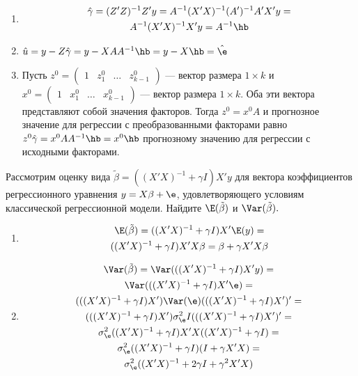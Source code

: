 \documentclass[pdftex,11pt,openany]{book}\usepackage[]{graphicx}\usepackage[]{color}
\begin{document}
\begin{solution}
\begin{enumerate}
\item 
\begin{multline}
\hat{\gamma} = (Z'Z)^{-1}Z'y = A^{-1}(X'X)^{-1}(A')^{-1}A'X'y =\\
 A^{-1}(X'X)^{-1} X'y = A^{-1}\hb
\end{multline}
\item $\hat{u} = y - Z\hat{\gamma} = y - XAA^{-1}\hb = y - X\hb = \hat{\e}$
\item Пусть $z^0 = \begin{pmatrix} 1 & z_1^0 & \dots & z_{k-1}^0 \end{pmatrix}$ --- вектор размера $1 \times k$ и $x^0 = \begin{pmatrix} 1 & x_1^0 & \dots & x_{k-1}^0 \end{pmatrix}$ --- вектор размера $1 \times k$. Оба эти вектора представляют собой значения факторов. Тогда $z^0 = x^0 A$ и прогнозное значение для регрессии с преобразованными факторами равно $z^0 \hat{\gamma} = x^0 AA^{-1} \hb = x^0 \hb$ прогнозному значению для регрессии с исходными факторами. 
\end{enumerate}
\end{solution}


\begin{problem}
Рассмотрим оценку вида $\tilde{\beta} = ((X'X)^{-1} + \gamma I)X'y$ для вектора коэффициентов регрессионного уравнения $y = X\beta + \e$, удовлетворяющего условиям классической регрессионной модели. Найдите $\E(\tilde{\beta})$ и $\Var(\tilde{\beta}).$ 
\end{problem}

\begin{solution}
\begin{enumerate}
\item 
\begin{multline}
\E(\tilde{\beta}) = ((X'X)^{-1} + \gamma I)X'\E(y) = \\
 ((X'X)^{-1} + \gamma I)X'X\beta = \beta + \gamma X'X\beta
\end{multline}
\item 
\begin{multline}
\Var(\tilde{\beta}) = \Var(((X'X)^{-1} + \gamma I)X'y) = \\
 \Var(((X'X)^{-1} + \gamma I)X'\e) = \\
 (((X'X)^{-1} + \gamma I)X')\Var(\e)(((X'X)^{-1} + \gamma I)X')'=  \\
  (((X'X)^{-1} + \gamma I)X')\sigma_{\e}^2 I(((X'X)^{-1} + \gamma I)X')'= \\
  \sigma_{\e}^2((X'X)^{-1} + \gamma I)X'X((X'X)^{-1} + \gamma I) = \\
  \sigma_{\e}^2((X'X)^{-1} + \gamma I)(I + \gamma X'X) =\\
   \sigma_{\e}^2((X'X)^{-1} + 2\gamma I + \gamma ^2 X'X)
\end{multline}
\end{enumerate}
\end{solution}
\end{document}
